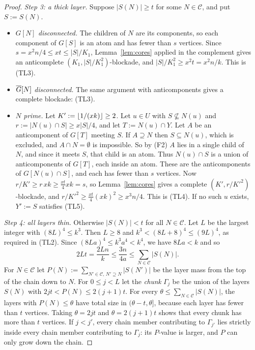 \begin{proof}
\emph{Step 3: a thick layer.} Suppose $|S(N)|\ge t$ for some $N\in\mathcal C$, and put $S:=S(N)$.
\begin{itemize}[leftmargin=1.5em]
\item \emph{$G[N]$ disconnected.} The children of $N$ are its components, so each component of $G[S]$ is
  an atom and has fewer than $s$ vertices. Since $s=x^2n/4\le xt\le|S|/K_1$, Lemma~\ref{lem:cores}
  applied in the complement gives an anticomplete $(K_1,|S|/K_1^2)$-blockade, and $|S|/K_1^2\ge
  x^2t=x^2n/k$. This is (TL3).
\item \emph{$\overline{G}[N]$ disconnected.} The same argument with anticomponents gives a complete blockade: (TL3).
\item \emph{$N$ prime.} Let $K':=\lfloor 1/(xk)\rfloor\ge2$. Let $u\in U$ with $S\not\subseteq N(u)$ and
  $r:=|N(u)\cap S|\ge x|S|/4$, and let $T:=N(u)\cap Y$. Let $A$ be an anticomponent of $G[T]$ meeting $S$.
  If $A\supseteq N$ then $S\subseteq N(u)$, which is excluded, and $A\cap N=\emptyset$ is impossible. So by
  (F2) $A$ lies in a single child of $N$, and since it meets $S$, that child is an atom. Thus $N(u)\cap S$
  is a union of anticomponents of $G[T]$, each inside an atom. These are the anticomponents of $G[N(u)\cap
  S]$, and each has fewer than $s$ vertices. Now $r/K'\ge r\,xk\ge\frac{xt}4xk=s$, so
  Lemma~\ref{lem:cores} gives a complete $(K',r/K'^2)$-blockade, and $r/K'^2\ge\frac{xt}{4}(xk)^2\ge
  x^3n/4$. This is (TL4). If no such $u$ exists, $Y':=S$ satisfies (TL5).
\end{itemize}

\emph{Step 4: all layers thin.} Otherwise $|S(N)|<t$ for all $N\in\mathcal C$. Let $L$ be the largest
integer with $(8L)^4\le k^3$. Then $L\ge8$ and $k^3<(8L+8)^4\le(9L)^4$, as required in (TL2). Since
$(8La)^4\le k^3a^4<k^4$, we have $8La<k$ and so
\[
2Lt=\frac{2Ln}{k}\le\frac{3n}{4a}\le\sum_{N\in\mathcal C}|S(N)| .
\]
For $N\in\mathcal C$ let $P(N):=\sum_{N'\in\mathcal C,\,N'\supseteq N}|S(N')|$ be the layer mass from the top
of the chain down to $N$. For $0\le j<L$ let the \emph{chunk} $\Gamma_j$ be the union of the layers $S(N)$
with $2jt<P(N)\le2(j+1)t$. For every $\theta\le\sum_{N\in\mathcal C}|S(N)|$, the layers with $P(N)\le\theta$
have total size in $(\theta-t,\theta]$, because each layer has fewer than $t$ vertices. Taking
$\theta=2jt$ and $\theta=2(j+1)t$ shows that every chunk has more than $t$ vertices. If $j<j'$, every chain
member contributing to $\Gamma_{j'}$ lies strictly inside every chain member contributing to $\Gamma_j$:
its $P$-value is larger, and $P$ can only grow down the chain.


\end{proof}
